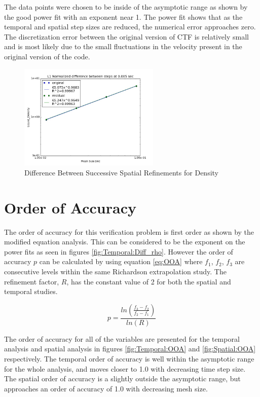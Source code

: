 The data points were chosen to be inside of the asymptotic range as shown by
the good power fit with an exponent near 1. The power fit shows that as the
temporal and spatial step sizes are reduced, the numerical error approaches
zero. The discretization error between the original version of CTF is
relatively small and is most likely due to the small fluctuations in the
velocity present in the original version of the code. 

\begin{figure}[!h]
	\centering
	\includegraphics[width=0.60\textwidth]{images/Spatial_Study/Difference_rho}
	\caption{Difference Between Successive Spatial Refinements for Density}
	\label{fig:Spatial:Diff_rho}
\end{figure} 

\section{Order of Accuracy}

The order of accuracy for this verification problem is first order as shown by
the modified equation analysis. This can be considered to be the exponent on
the power fits as seen in figures \ref{fig:Temporal:Diff_rho}. However the order
of accuracy $p$ can be calculated by using equation \ref{eq:OOA} where $f_{1}$,
$f_{2}$, $f_{3}$ are consecutive levels within the same Richardson extrapolation
study. The refinement factor, $R$, has the constant value of 2 for both the
spatial and temporal studies.

\begin{equation}
	\label{eq:OOA}
	p= \frac{
	      	ln \left(
	      	\frac{f_{3}-f_{2}}{f_{2}-f_{1}}
	      	\right)
	    }{ln(R)}
\end{equation}

The order of accuracy for all of the variables are presented for the temporal
analysis and spatial analysis in figures \ref{fig:Temporal:OOA} and
\ref{fig:Spatial:OOA} respectively. The temporal order of accuracy is well
within the asymptotic range for the whole analysis, and moves closer to 1.0 with
decreasing time step size. The spatial order of accuracy is a slightly outside
the asymptotic range, but approaches an order of accuracy of 1.0 with
decreasing mesh size. 

